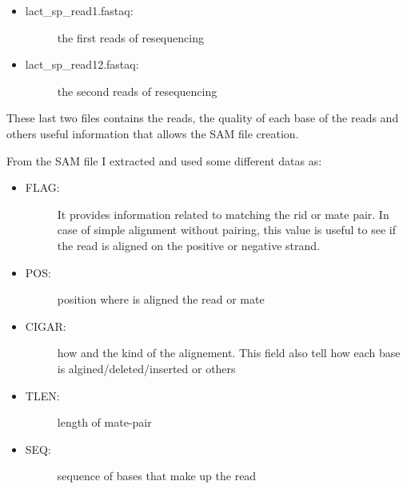 \begin{itemize}
\item \begin{description}
		\item[lact\_sp\_read1.fastaq:] the first reads of resequencing
	  \end{description}
\end{itemize}

\begin{itemize}
\item \begin{description}
		\item[lact\_sp\_read12.fastaq:] the second reads of resequencing
	  \end{description}
\end{itemize}
  
These last two files contains the reads, the quality of each base of the reads and others useful information that allows the SAM file creation.

From the SAM file I extracted and used some different datas as:

\begin{itemize}
\item \begin{description}
		\item[FLAG:] It provides information related to matching the rid or mate pair. In case of simple alignment without pairing, this value is useful to see if the read is aligned on the positive or negative strand.
	  \end{description}
\end{itemize}


\begin{itemize}
\item \begin{description}
		\item[POS:] position where is aligned the read or mate
		  \end{description}
\end{itemize}

\begin{itemize}
\item \begin{description}
		\item[CIGAR:] how and the kind of the alignement. This field also tell how each base is algined/deleted/inserted or others
  \end{description}
\end{itemize}
\begin{itemize}
\item \begin{description}
		\item[TLEN:] length of mate-pair
		  \end{description}
\end{itemize}
\begin{itemize}
\item \begin{description}
		\item[SEQ:] sequence of bases that make up the read
  \end{description}
\end{itemize}


